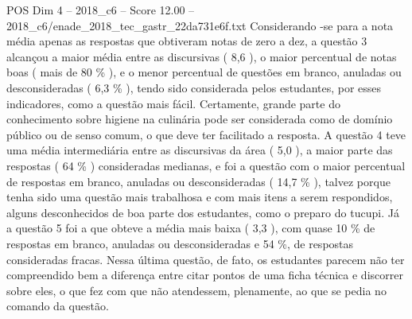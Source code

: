 \begin{textsample}{POS Dim 4 – 2018\_c6 – Score 12.00 – 2018\_c6/enade\_2018\_tec\_gastr\_22da731e6f.txt}
Considerando -se para a nota média apenas as respostas que obtiveram notas de zero a dez, a questão 3 alcançou a maior média entre as discursivas ( 8,6 ), o maior percentual de notas boas ( mais de 80 \% ), e o menor percentual de questões em branco, anuladas ou desconsideradas ( 6,3 \% ), tendo sido considerada pelos estudantes, por esses indicadores, como a questão mais fácil.
Certamente, grande parte do conhecimento sobre higiene na culinária pode ser considerada como de domínio público ou de senso comum, o que deve ter facilitado a resposta.
A questão 4 teve uma média intermediária entre as discursivas da área ( 5,0 ), a maior parte das respostas ( 64 \% ) consideradas medianas, e foi a questão com o maior percentual de respostas em branco, anuladas ou desconsideradas ( 14,7 \% ), talvez porque tenha sido uma questão mais trabalhosa e com mais itens a serem respondidos, alguns desconhecidos de boa parte dos estudantes, como o preparo do tucupi.
Já a questão 5 foi a que obteve a média mais baixa ( 3,3 ), com quase 10 \% de respostas em branco, anuladas ou desconsideradas e 54 \%, de respostas consideradas fracas.
Nessa última questão, de fato, os estudantes parecem não ter compreendido bem a diferença entre citar pontos de uma ficha técnica e discorrer sobre eles, o que fez com que não atendessem, plenamente, ao que se pedia no comando da questão.

\end{textsample}
